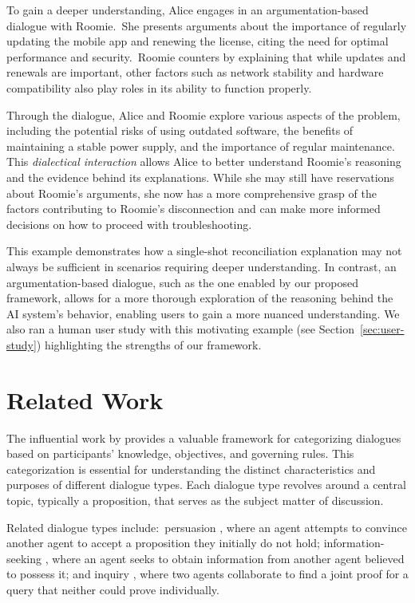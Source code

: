 \documentclass{article}
\begin{document}
To gain a deeper understanding, Alice engages in an argumentation-based dialogue with Roomie.~She presents arguments about the importance of regularly updating the mobile app and renewing the license, citing the need for optimal performance and security.~Roomie counters by explaining that while updates and renewals are important, other factors such as network stability and hardware compatibility also play roles in its ability to function properly.

Through the dialogue, Alice and Roomie explore various aspects of the problem, including the potential risks of using outdated software, the benefits of maintaining a stable power supply, and the importance of regular maintenance. This \textit{dialectical interaction} allows Alice to better understand Roomie's reasoning and the evidence behind its explanations. While she may still have reservations about Roomie's arguments, she now has a more comprehensive grasp of the factors contributing to Roomie's disconnection and can make more informed decisions on how to proceed with troubleshooting.

This example demonstrates how a single-shot reconciliation explanation may not always be sufficient in scenarios requiring deeper understanding. In contrast, an argumentation-based dialogue, such as the one enabled by our proposed framework, allows for a more thorough exploration of the reasoning behind the AI system's behavior, enabling users to gain a more nuanced understanding. We also ran a human user study with this motivating example (see Section~\ref{sec:user-study}) highlighting the strengths of our framework. 



\section{Related Work}


The influential work by \citet{walton1995commitment} provides a valuable framework for categorizing dialogues based on participants' knowledge, objectives, and governing rules. This categorization is essential for understanding the distinct characteristics and purposes of different dialogue types. Each dialogue type revolves around a central topic, typically a proposition, that serves as the subject matter of discussion. 

Related dialogue types include:~persuasion \citep{gordon1994,prakken2006formal}, where an agent attempts to convince another agent to accept a proposition they initially do not hold; information-seeking \citep{parsons2003properties,fan2012agent}, where an agent seeks to obtain information from another agent believed to possess it; and inquiry \citep{hitchcock2017some,black2009inquiry}, where two agents collaborate to find a joint proof for a query that neither could prove individually.
\end{document}
